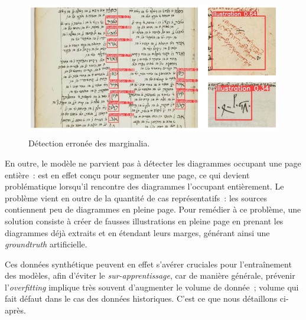           \begin{figure}[H]
          \begin{center}
          \includegraphics[height=6cm]{figues/marginalia.png}
          \end{center}
          \caption{Détection erronée des marginalia.}
          \label{fig:marginalia} \end{figure}

En outre, le modèle ne parvient pas à détecter les diagrammes occupant
une page entière~: \yolo est en effet conçu pour segmenter une page, ce
qui devient problématique lorsqu'il rencontre des diagrammes l'occupant
entièrement. Le problème vient en outre de la quantité de cas
représentatifs~: les sources contiennent peu de diagrammes en pleine
page. Pour remédier à ce problème, une solution consiste à créer de
fausses illustrations en pleine page en prenant les diagrammes déjà
extraits et en étendant leurs marges, générant ainsi une \textit{groundtruth}
artificielle.

Ces données synthétique peuvent en effet s'avérer cruciales pour
l'entraînement des modèles, afin d'éviter le \textit{sur-apprentissage}, car de
manière générale, prévenir l'\textit{overfitting} implique très souvent
d'augmenter le volume de donnée~; volume qui fait défaut dans le cas des
données historiques. C'est ce que nous détaillons ci-après.
